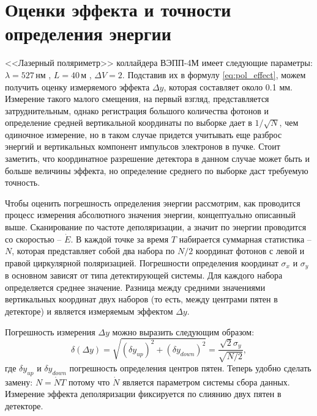 \section{Оценки эффекта и точности определения энергии}
<<Лазерный поляриметр>> коллайдера ВЭПП-4М имеет следующие параметры: $\lambda = 527$\,нм , $L = 40$\,м , $\Delta V = 2$. Подставив их в формулу \ref{eq:pol_effect}, можем получить оценку измеряемого эффекта $\Delta y$, которая составляет около  0.1 мм. Измерение такого малого смещения, на первый взгляд, представляется затруднительным, однако регистрация большого количества фотонов и определение средней вертикальной координаты по выборке дает в $1/\sqrt{N}$, чем одиночное измерение, но в таком случае придется учитывать еще разброс энергий  и вертикальных компонент импульсов электронов в пучке. Стоит заметить, что координатное разрешение детектора в данном случае может быть и больше величины эффекта, но определение среднего по выборке даст требуемую точность. 
\par Чтобы оценить погрешность определения энергии рассмотрим, как проводится процесс измерения абсолютного значения энергии, концептуально описанный выше. Сканирование по частоте деполяризации, а значит по энергии проводится со скоростью -- $\dot{E}$. В каждой точке за время $T$ набирается суммарная статистика -- $N$, которая представляет собой два набора по $N/2$ координат фотонов с левой и правой циркулярной поляризацией. Погрешности определения координат $\sigma_x$ и $\sigma_y$  в основном зависят от типа детектирующей системы. Для каждого набора определяется среднее значение. Разница между средними значениями вертикальных координат двух наборов (то есть, между центрами пятен в детекторе) и является измеряемым эффектом $\Delta y$. 

 Погрешность измерения $\Delta y$ можно выразить следующим образом: 
\begin{equation}
	\delta(\Delta y) = \sqrt{(\delta y_{up})^2 + (\delta y_{down})^2} = \frac{\sqrt{2} \sigma_y}{\sqrt{N/2}},
\end{equation}
где $\delta y_{up}$ и $\delta y_{down}$ погрешность определения центров пятен.
Теперь удобно сделать замену: $N = \dot{N}T$ потому что $\dot{N}$ является параметром системы сбора данных. Измерение эффекта деполяризации фиксируется по слиянию двух пятен в детекторе. 

